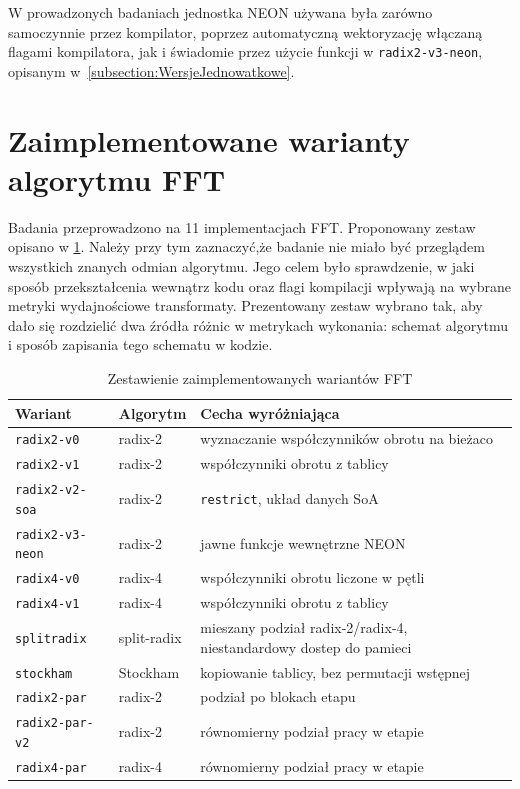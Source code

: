 W prowadzonych badaniach jednostka NEON używana była zarówno samoczynnie przez kompilator, poprzez
automatyczną wektoryzację włączaną flagami kompilatora, jak i świadomie przez użycie funkcji w \texttt{radix2-v3-neon}, opisanym w~\cref{subsection:WersjeJednowatkowe}.

\section{Zaimplementowane warianty algorytmu FFT}\label{section:WariantyFFTUzyteWPracy}

Badania przeprowadzono na 11 implementacjach FFT. Proponowany zestaw opisano w \cref{tab:warianty-fft}. Należy przy tym zaznaczyć,że badanie nie miało być przeglądem wszystkich
znanych odmian algorytmu. Jego celem było sprawdzenie, w jaki sposób przekształcenia wewnątrz kodu
oraz flagi kompilacji wpływają na wybrane metryki wydajnościowe transformaty.  Prezentowany zestaw wybrano tak, aby dało się rozdzielić dwa źródła
różnic w metrykach wykonania: schemat algorytmu i sposób zapisania tego schematu
w kodzie.

\begin{table}[htbp]
  \centering
  \caption{Zestawienie zaimplementowanych wariantów FFT}
  \label{tab:warianty-fft}
  \begin{tabularx}{\textwidth}{l l X}
    \toprule
    Wariant & Algorytm & Cecha wyróżniająca \\
    \midrule
    \texttt{radix2-v0}      & radix-2       & wyznaczanie współczynników obrotu na bieżaco \\
    \texttt{radix2-v1}      & radix-2       & współczynniki obrotu z tablicy \\
    \texttt{radix2-v2-soa}  & radix-2       & \texttt{restrict}, układ danych SoA \\
    \texttt{radix2-v3-neon} & radix-2      & jawne funkcje wewnętrzne NEON \\
    \texttt{radix4-v0}   & radix-4       & współczynniki obrotu liczone w pętli \\
    \texttt{radix4-v1}         & radix-4       & współczynniki obrotu z tablicy \\
    \texttt{splitradix}     & split-radix   & mieszany podział radix-2/radix-4, niestandardowy dostep do pamieci  \\
    \texttt{stockham}       & Stockham      & kopiowanie tablicy, bez permutacji wstępnej \\
    \midrule
    \texttt{radix2-par}     & radix-2      & podział po blokach etapu \\
    \texttt{radix2-par-v2}  & radix-2      & równomierny podział pracy w etapie\\
    \texttt{radix4-par}     & radix-4       & równomierny podział pracy w etapie \\
    \bottomrule
  \end{tabularx}
\end{table}

